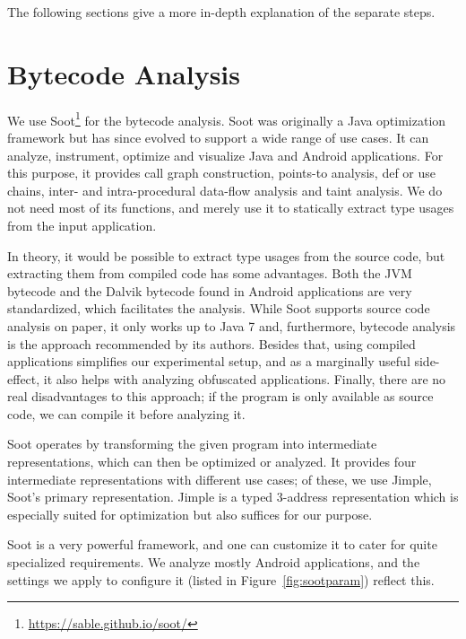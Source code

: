 The following sections give a more in-depth explanation of the separate steps.

\section{Bytecode Analysis}\label{sec:bytecode}

We use Soot\footnote{\url{https://sable.github.io/soot/}} for the bytecode analysis.
Soot was originally a Java optimization framework but has since evolved to support a wide range of use cases.
It can analyze, instrument, optimize and visualize Java and Android applications.
For this purpose, it provides call graph construction, points-to analysis, def or use chains, inter- and intra-procedural data-flow analysis and taint analysis.
We do not need most of its functions, and merely use it to statically extract type usages from the input application.

In theory, it would be possible to extract type usages from the source code, but extracting them from compiled code has some advantages.
Both the JVM bytecode and the Dalvik bytecode found in Android applications are very standardized, which facilitates the analysis.
While Soot supports source code analysis on paper, it only works up to Java 7 and, furthermore, bytecode analysis is the approach recommended by its authors.
Besides that, using compiled applications simplifies our experimental setup, and as a marginally useful side-effect, it also helps with analyzing obfuscated applications.
Finally, there are no real disadvantages to this approach; if the program is only available as source code, we can compile it before analyzing it.

Soot operates by transforming the given program into intermediate representations, which can then be optimized or analyzed.
It provides four intermediate representations with different use cases; of these, we use Jimple, Soot's primary representation.
Jimple is a typed 3-address representation which is especially suited for optimization but also suffices for our purpose.

Soot is a very powerful framework, and one can customize it to cater for quite specialized requirements.
We analyze mostly Android applications, and the settings we apply to configure it (listed in Figure~\ref{fig:sootparam}) reflect this.

